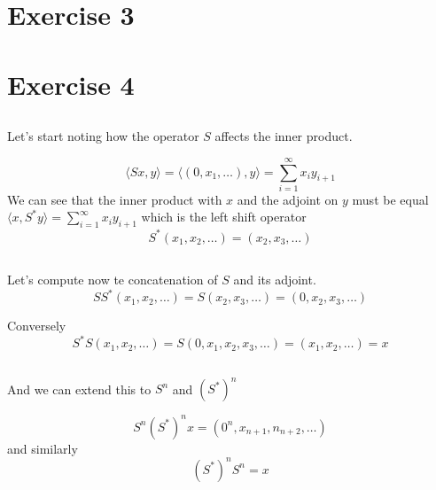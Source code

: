 \documentclass[a4paper,12pt]{article} %
\begin{document}
\section{Exercise 3}





\section{Exercise 4}
\subsection{}
Let's start noting how the operator \(S\) affects the inner product.

\[
    \langle Sx,y \rangle = \langle (0,x_1  , \dots ),y \rangle = \sum_{i=1}^{\infty} x_i y_{i+1}
\]
We can see that the inner product with \(x\) and the adjoint on \(y\) must be equal  \(\langle x,S^*y \rangle=\sum_{i=1}^{\infty} x_i y_{i+1} \)
which is the left shift operator
\[
    S^*(x_1,x_2,\dots ) = (x_2,x_3, \dots  )
\]
\subsection{}
Let's compute now te concatenation of \(S\) and its adjoint.
\[
    SS^*(x_1,x_2,\dots )=S(x_2,x_3, \dots  ) = (0,x_2,x_3, \dots  )
\]

Conversely
\[
    S^*S(x_1,x_2,\dots )=S(0,x_1,x_2,x_3, \dots  ) = (x_1,x_2, \dots  ) = x
\]

\subsection{}
And we can extend this to \(S^n\) and \((S^*)^n\)

\[
    S^n (S^*)^nx = (0^n,x_{n+1}, n_{n+2},\dots )
\]
and similarly
\[
    (S^*)^n S^n = x
\]
\end{document}
